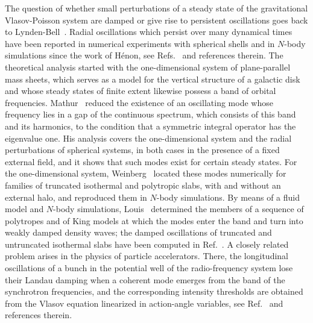 The question of whether small perturbations of a steady state of the gravitational Vlasov-Poisson system are damped or give rise to persistent oscillations goes back to Lynden-Bell~\cite{dL62}. Radial oscillations which persist over many dynamical times have been reported in numerical experiments with spherical shells and in $N$-body simulations since the work of H\'enon, see Refs.~\cite{mH73,pLoG88} and references therein. The theoretical analysis started with the one-dimensional system of plane-parallel mass sheets, which serves as a model for the vertical structure of a galactic disk and whose steady states of finite extent likewise possess a band of orbital frequencies. Mathur~\cite{sM90} reduced the existence of an oscillating mode whose frequency lies in a gap of the continuous spectrum, which consists of this band and its harmonics, to the condition that a symmetric integral operator has the eigenvalue one. His analysis covers the one-dimensional system and the radial perturbations of spherical systems, in both cases in the presence of a fixed external field, and it shows that such modes exist for certain steady states. For the one-dimensional system, Weinberg~\cite{mW91} located these modes numerically for families of truncated isothermal and polytropic slabs, with and without an external halo, and reproduced them in $N$-body simulations. By means of a fluid model and $N$-body simulations, Louis~\cite{pL92} determined the members of a sequence of polytropes and of King models at which the modes enter the band and turn into weakly damped density waves; the damped oscillations of truncated and untruncated isothermal slabs have been computed in Ref.~\cite{lWgB15}. A closely related problem arises in the physics of particle accelerators. There, the longitudinal oscillations of a bunch in the potential well of the radio-frequency system lose their Landau damping when a coherent mode emerges from the band of the synchrotron frequencies, and the corresponding intensity thresholds are obtained from the Vlasov equation linearized in action-angle variables, see Ref.~\cite{iKtAeS21} and references therein.

